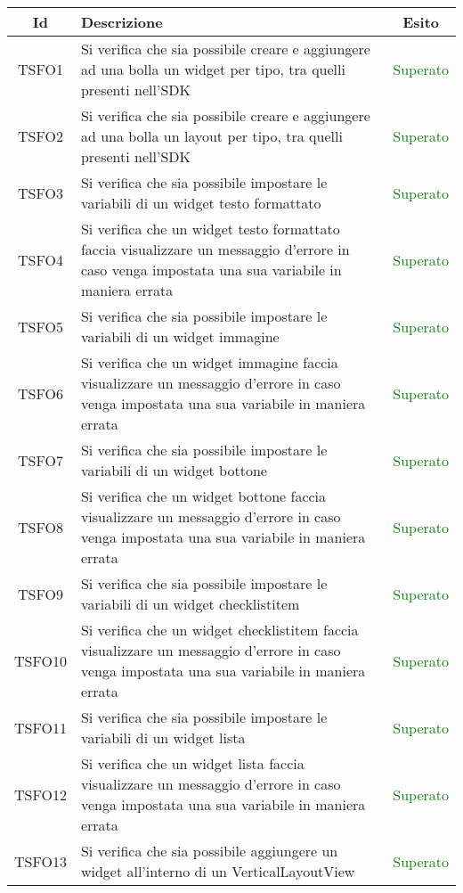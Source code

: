 \begin{center}
	\begin{longtable}{|c|>{\centering}m{10cm}|c|}\hline
		Id & Descrizione & Esito\\ \hline
		TSFO1 & Si verifica che sia possibile creare e aggiungere ad una bolla un widget per tipo, tra quelli presenti nell'SDK & \textcolor{Green}{Superato}\\ \hline
		TSFO2 & Si verifica che sia possibile creare e aggiungere ad una bolla un layout per tipo, tra quelli presenti nell'SDK & \textcolor{Green}{Superato}\\ \hline
		TSFO3 & Si verifica che sia possibile impostare le variabili di un widget testo formattato & \textcolor{Green}{Superato}\\ \hline
		TSFO4 & Si verifica che un widget testo formattato faccia visualizzare un messaggio d'errore in caso venga impostata una sua variabile in maniera errata & \textcolor{Green}{Superato}\\ \hline
		TSFO5 & Si verifica che sia possibile impostare le variabili di un widget immagine & \textcolor{Green}{Superato}\\ \hline
		TSFO6 & Si verifica che un widget immagine faccia visualizzare un messaggio d'errore in caso venga impostata una sua variabile in maniera errata & \textcolor{Green}{Superato}\\ \hline
		TSFO7 & Si verifica che sia possibile impostare le variabili di un widget bottone & \textcolor{Green}{Superato}\\ \hline
		TSFO8 & Si verifica che un widget bottone faccia visualizzare un messaggio d'errore in caso venga impostata una sua variabile in maniera errata & \textcolor{Green}{Superato}\\ \hline
		TSFO9 & Si verifica che sia possibile impostare le variabili di un widget checklistitem & \textcolor{Green}{Superato}\\ \hline
		TSFO10 & Si verifica che un widget checklistitem faccia visualizzare un messaggio d'errore in caso venga impostata una sua variabile in maniera errata & \textcolor{Green}{Superato}\\ \hline
		TSFO11 & Si verifica che sia possibile impostare le variabili di un widget lista & \textcolor{Green}{Superato}\\ \hline
		TSFO12 & Si verifica che un widget lista faccia visualizzare un messaggio d'errore in caso venga impostata una sua variabile in maniera errata & \textcolor{Green}{Superato}\\ \hline
		TSFO13 & Si verifica che sia possibile aggiungere un widget all'interno di un VerticalLayoutView & \textcolor{Green}{Superato}\\ \hline

\end{longtable}
\end{center}

